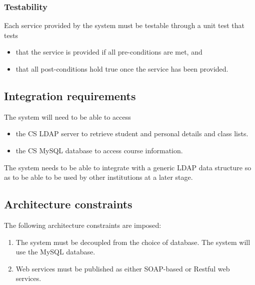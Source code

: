\documentclass[11pt,a4paper]{article}
\begin{document}
	\subsubsection{Testability}
	Each service provided by the system must be testable through a unit test that tests
	\begin{itemize}
		\item that the service is provided if all pre-conditions are met, and
		\item that all post-conditions hold true once the service has been provided.
	\end{itemize}

\subsection{Integration requirements}
The system will need to be able to access
\begin{itemize}
	\item the CS LDAP server to retrieve student and personal details and class lists.
	\item the CS MySQL database to access course information.
\end{itemize}

The system needs to be able to integrate with a generic LDAP data structure so as to be able to be used by other institutions at a later stage.

\subsection{Architecture constraints}
The following architecture constraints are imposed:
\begin{enumerate}
	\item The system must be decoupled from the choice of database. The system will use the MySQL database.
	\item Web services must be published as either SOAP-based or Restful web services.
\end{enumerate}
\end{document}
